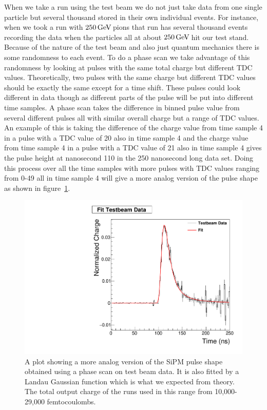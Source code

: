 When we take a run using the test beam we do not just take data from one single particle but several thousand stored in their own individual events. For instance, when we took a run with $250{\,\text{Ge\hspace{-.08em}V\hspace{-0.16em}}}$ pions that run has several thousand events recording the data when the particles all at about $250{\,\text{Ge\hspace{-.08em}V\hspace{-0.16em}}}$ hit our test stand. Because of the nature of the test beam and also just quantum mechanics there is some randomness to each event. To do a phase scan we take advantage of this randomness by looking at pulses with the same total charge but different TDC values. Theoretically, two pulses with the same charge but different TDC values should be exactly the same except for a time shift. These pulses could look different in data though as different parts of the pulse will be put into different time samples. A phase scan takes the difference in binned pulse value from several different pulses all with similar overall charge but a range of TDC values. An example of this is taking the difference of the charge value from time sample 4 in a pulse with a TDC value of 20 also in time sample 4 and the charge value from time sample 4 in a pulse with a TDC value of 21 also in time sample 4 gives the pulse height at nanosecond 110 in the 250 nanosecond long data set. Doing this process over all the time samples with more pulses with TDC values ranging from 0-49 all in time sample 4 will give a more analog version of the pulse shape as shown in figure~\ref{fig:fit}.

\begin{figure}
\centering
\includegraphics[width=0.8\linewidth]{Figures/FittedPlot.pdf}
\caption{A plot showing a more analog version of the SiPM pulse shape obtained using a phase scan on test beam data. It is also fitted by a Landau Gaussian function which is what we expected from theory. The total output charge of the runs used in this range from 10,000-29,000 femtocoulombs.}
\label{fig:fit}
\end{figure}

